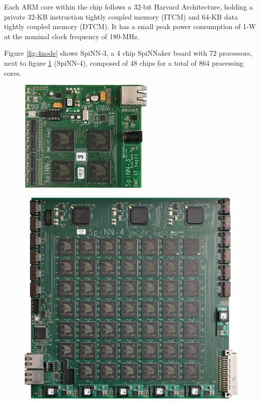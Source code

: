 Each ARM core within the chip follows a 32-bit Harvard Architecture, holding a private 32-KB instruction tightly coupled memory (ITCM) and 64-KB data tightly coupled memory (DTCM).\cite{painkras} It has a small peak power consumption of 1-W at the nominal clock frequency of 180-MHz.\cite{arm968}

Figure \ref{fig:4node} shows SpiNN-3, a 4 chip SpiNNaker board with 72 processors, next to figure \ref{fig:48node} (SpiNN-4), composed of 48 chips for a total of 864 processing cores.

\begin{figure}
\centering
\begin{minipage}{.5\textwidth}
  \centering
  \includegraphics[width=0.4\linewidth, natwidth=245, natheight=205]{images/4node.jpg}
  \label{fig:4node}
\end{minipage}%
\begin{minipage}{.5\textwidth}
  \centering
  \includegraphics[width=0.9\linewidth, natwidth=945, natheight=896]{images/48node.jpg}
  \label{fig:48node}
\end{minipage}
\end{figure}

